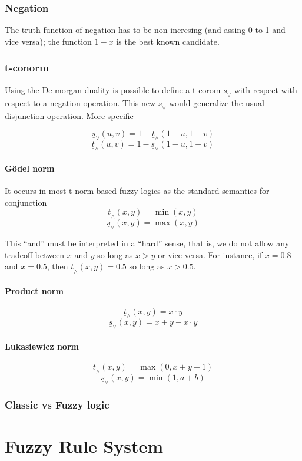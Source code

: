 \documentclass[]{article}
\newcommand{\tnorm}{\underline{t}_{\land}}
\newcommand{\snorm}{\underline{s}_{\lor}}
\begin{document}
\subsubsection{Negation}
The truth function of negation has to be non-incresing (and assing 0 to 1 and
vice versa); the function $1 - x$ is the best known candidate.
\subsubsection{t-conorm}
Using the De morgan duality is possible to define a t-corom $\snorm$ with respect
with respect to a negation operation. This new $\snorm$ would generalize the usual
disjunction operation. More specific

$$ \snorm(u, v) = 1 - \tnorm(1 - u, 1 - v) $$
$$ \tnorm(u, v) = 1 - \snorm(1 - u, 1 - v) $$
\paragraph{Gödel norm}
It occurs in most t-norm based fuzzy logics as the standard semantics for conjunction
$$ \tnorm(x, y) = \min{(x, y)} $$
$$ \snorm(x, y) = \max{(x, y)} $$

This ``and'' must be interpreted in a ``hard'' sense, that is, we do not allow
any tradeoff between $x$ and $y$ so long as $x > y$ or vice-versa. For instance,
if $x = 0.8$ and $x = 0.5$, then $\tnorm(x, y) = 0.5$ so long as $x > 0.5$.
\paragraph{Product norm}
$$ \tnorm(x, y) = x \cdot y $$
$$ \snorm(x, y) = x + y - x \cdot y $$

\paragraph{Lukasiewicz norm}
$$ \tnorm(x, y) = \max{(0, x + y - 1)} $$
$$ \snorm(x, y) = \min{(1, a + b)} $$


\subsubsection{Classic vs Fuzzy logic}
\section{Fuzzy Rule System}


\end{document}
